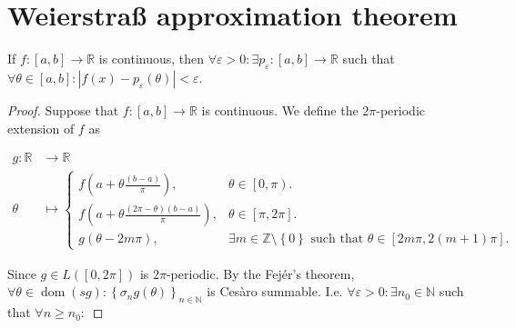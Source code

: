 \section{Weierstraß approximation theorem}



\begin{frame}[allowframebreaks]
	\begin{theorem}
		If $f\colon\left[a,b\right]\to\mathds{R}$ is continuous, then
		\begin{math}
			\forall\varepsilon>0:
			\exists
			p_{\varepsilon}\colon\left[a,b\right]\to\mathds{R}
		\end{math}
		such that
		\begin{math}
			\forall\theta\in\left[a,b\right]:
			\left|
			f\left(x\right)-
			p_{\varepsilon}\left(\theta\right)
			\right|<
			\varepsilon
		\end{math}.
	\end{theorem}

	\begin{proof}
		Suppose that $f\colon\left[a,b\right]\to\mathds{R}$ is
		continuous.
		We define the $2\pi$-periodic extension of $f$ as

		\begin{align*}
			g\colon\mathds{R} & \to\mathds{R} \\
			\theta            & \mapsto
			\begin{cases}
				f\left(
				a+\theta\frac{\left(b-a\right)}{\pi}
				\right),
				 & \theta\in\left[0,\pi\right).
				\\
				f\left(
				a+\theta\frac{\left(2\pi-\theta\right)\left(b-a\right)}{\pi}
				\right),
				 & \theta\in\left[\pi,2\pi\right].
				\\
				g\left(\theta-2m\pi\right),
				 & \exists m\in\mathds{Z}\setminus\left\{0\right\}
				\text{ such that }
				\theta\in\left[2m\pi,2\left(m+1\right)\pi\right].
			\end{cases}
		\end{align*}

		Since
		\begin{math}
			g\in L\left(\left[0,2\pi\right]\right)
		\end{math}
		is $2\pi$-periodic.
		By the \alert{Fejér's theorem},
		\begin{math}
			\forall\theta\in\operatorname{dom}\left(sg\right):
			{\left\{
			\sigma_{n}g\left(\theta\right)
			\right\}}_{n\in\mathds{N}}
		\end{math}
		is Cesàro summable.
		I.e.
		\begin{math}
			\forall\varepsilon>0:
			\exists n_{0}\in\mathds{N}
		\end{math}
		such that
		\begin{math}
			\forall n\geq n_{0}:
		\end{math}


\end{proof}
\end{frame}
